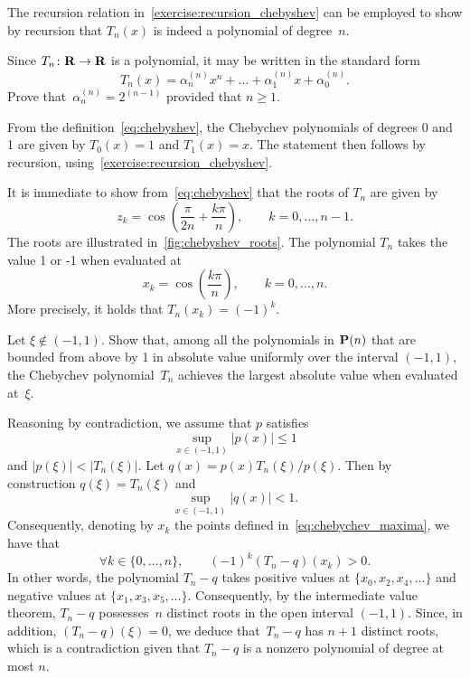 \begin{remark}
    The recursion relation in~\cref{exercise:recursion_chebyshev}
    can be employed to show by recursion that $T_n(x)$ is indeed a polynomial of degree~$n$.
\end{remark}

\begin{exercise}
    \label{exercise:chebyshev_leading_coefficient}
    Since $T_n\colon \mathbf R \to \mathbf R$ is a polynomial,
    it may be written in the standard form
    \[
        T_n(x) = \alpha^{(n)}_n x^n + \dotsc + \alpha^{(n)}_1 x + \alpha^{(n)}_0.
    \]
    Prove that~$\alpha^{(n)}_n = 2^{(n-1)}$ provided that $n \geq 1$.
\end{exercise}
\begin{solution}
    From the definition~\eqref{eq:chebyshev},
    the Chebychev polynomials of degrees 0 and 1 are given by $T_0(x) = 1$ and $T_1(x) = x$.
    The statement then follows by recursion, using~\cref{exercise:recursion_chebyshev}.
\end{solution}

It is immediate to show from~\eqref{eq:chebyshev} that the roots of $T_n$ are given by
\[
    z_k = \cos \left( \frac{\pi}{2n} + \frac{k\pi}{n} \right), \qquad k = 0, \dotsc, n-1.
\]
The roots are illustrated in~\cref{fig:chebyshev_roots}.
The polynomial $T_n$ takes the value 1 or -1 when evaluated at
\begin{equation}
    \label{eq:chebychev_maxima}
    x_k = \cos \left( \frac{k \pi}{n} \right), \qquad k = 0, \dotsc, n.
\end{equation}
More precisely, it holds that $T_n(x_k) = (-1)^k$.

\begin{exercise}
    Let $\xi \notin (-1, 1)$.
    Show that, among all the polynomials in $\mathbf P(n)$ that are bounded from above by 1 in absolute value uniformly over the interval $(-1, 1)$,
    the Chebychev polynomial~$T_n$ achieves the largest absolute value when evaluated at~$\xi$.
\end{exercise}
\begin{solution}
    Reasoning by contradiction,
    we assume that $p$ satisfies
    \[
        \sup_{x \in (-1, 1)} \lvert p(x) \rvert \leq 1
    \]
    and $\lvert p(\xi) \rvert < \lvert T_n(\xi) \rvert$.
    Let $q(x) = p(x) T_n(\xi) / p(\xi)$.
    Then by construction $q(\xi) = T_n(\xi)$
    and
    \[
       \sup_{x \in (-1, 1)} \lvert q(x) \rvert < 1.
    \]
    Consequently, denoting by $x_k$ the points defined in~\eqref{eq:chebychev_maxima},
    we have that
    \[
        \forall k \in \{0, \dotsc, n\}, \qquad
        (-1)^k (T_n - q)(x_k) > 0.
    \]
    In other words, the polynomial $T_n - q$ takes positive values at $\{x_0, x_2, x_4, \dotsc\}$ and negative values at $\{x_1, x_3, x_5, \dotsc\}$.
    Consequently, by the intermediate value theorem,
    $T_n - q$ possesses~$n$ distinct roots in the open interval $(-1, 1)$.
    Since, in addition, $(T_n - q)(\xi) = 0$,
    we deduce that~$T_n - q$ has $n+1$ distinct roots,
    which is a contradiction given that $T_n - q$ is a nonzero polynomial of degree at most $n$.
\end{solution}

